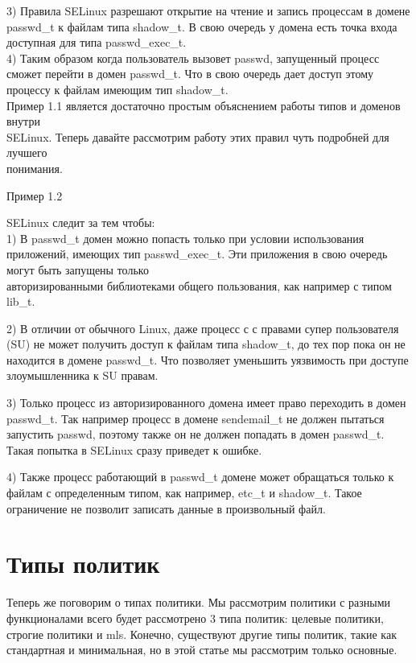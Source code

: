 \documentclass{article}
\begin{document}
3) Правила SELinux разрешают открытие на чтение и запись процессам в домене passwd\_t к файлам типа shadow\_t. В свою очередь у домена есть точка входа доступная для типа passwd\_exec\_t.\\

4) Таким образом когда пользователь вызовет passwd, запущенный процесс сможет перейти в домен passwd\_t. Что в свою очередь дает доступ этому процессу к файлам имеющим тип shadow\_t.\\

Пример 1.1 является достаточно простым объяснением работы типов и доменов внутри \\SELinux. Теперь давайте рассмотрим работу этих правил чуть подробней для лучшего \\понимания.

Пример 1.2

SELinux следит за тем чтобы:\\

1) В passwd\_t домен можно попасть только при условии использования приложений, имеющих тип passwd\_exec\_t. Эти приложения в свою очередь могут быть запущены только\\авторизированными библиотеками общего пользования, как например с типом lib\_t.

2) В отличии от обычного Linux, даже процесс с с правами супер пользователя (SU) не может получить доступ к файлам типа shadow\_t, до тех пор пока он не находится в домене passwd\_t. Что позволяет уменьшить уязвимость при доступе злоумышленника к SU правам.

3) Только процесс из авторизированного домена имеет право переходить в домен passwd\_t. Так например процесс в домене sendemail\_t не должен пытаться запустить passwd, поэтому также он не должен попадать в домен passwd\_t. Такая попытка в SELinux сразу приведет к ошибке.

4) Также процесс работающий в passwd\_t домене может обращаться только к файлам с определенным типом, как например, etc\_t и shadow\_t. Такое ограничение не позволит записать данные в произвольный файл.



\section{Типы политик}

Теперь же поговорим о типах политики. Мы рассмотрим политики с разными функционалами всего будет рассмотрено 3 типа политик: целевые политики, строгие политики и mls. Конечно, существуют другие типы политик, такие как стандартная и минимальная, но в этой статье мы рассмотрим только основные.
\end{document}
